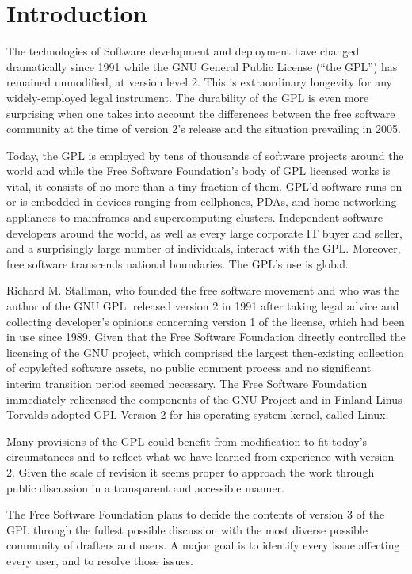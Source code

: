 \chapter*{Introduction}



The technologies of Software development and deployment have changed
dramatically since 1991 while the GNU General Public License (``the GPL'')
has remained unmodified, at version level 2. This is extraordinary longevity
for any widely-employed legal instrument. The durability of the GPL is even
more surprising when one takes into account the differences between the
free software community at the time of version 2's release and the situation
prevailing in 2005.

Today, the GPL is employed by tens of thousands of software
projects around the world and while the Free Software Foundation's body
of GPL licensed works is vital, it consists of no more than a tiny fraction
of them. GPL'd software runs on or is embedded in devices ranging from
cellphones, PDAs, and home networking appliances to mainframes and
supercomputing clusters. Independent software developers around the
world, as well as every large corporate IT buyer and seller, and a
surprisingly large number of individuals, interact with the GPL. Moreover,
free software transcends national boundaries. The GPL's use is global.

Richard M. Stallman, who founded the free software movement and
who was the author of the GNU GPL, released version 2 in 1991 after
taking legal advice and collecting developer's opinions concerning version
1 of the license, which had been in use since 1989. Given that the Free
Software Foundation directly controlled the licensing of the GNU project,
which comprised the largest then-existing collection of copylefted software
assets, no public comment process and no significant interim transition
period seemed necessary. The Free Software Foundation immediately relicensed
the components of the GNU Project and in Finland Linus Torvalds
adopted GPL Version 2 for his operating system kernel, called Linux.

Many provisions of the GPL could benefit from modification to fit today's
circumstances and to reflect what we have learned from experience with
version 2. Given the scale of revision it seems proper to approach the work
through public discussion in a transparent and accessible manner.

The Free Software Foundation plans to decide the contents of version
3 of the GPL through the fullest possible discussion with the most diverse
possible community of drafters and users. A major goal is to identify every
issue affecting every user, and to resolve those issues.

